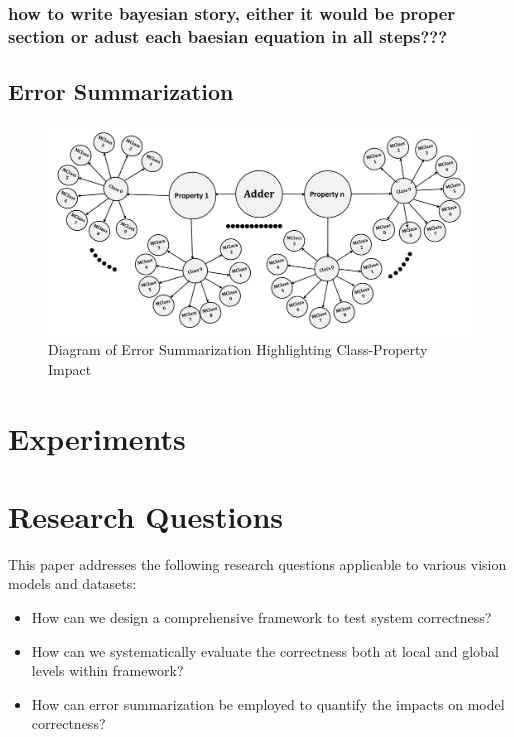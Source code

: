 \documentclass[10pt, conference, a4paper, final]{IEEEtran}
\begin{document}
 
\subsubsection{how to write bayesian story, either it would be proper section or adust each baesian equation in all steps??? }
\subsection{Error Summarization}

\begin{figure}[H]
    \centering
    \includegraphics[width=\linewidth]{paper_images/step5.pdf}
    \caption{Diagram of Error Summarization Highlighting Class-Property Impact}
    \label{fig:error-summarization}
\end{figure}





\section{Experiments}

\section{Research Questions}

This paper addresses the following research questions applicable to various vision models and datasets:

\begin{itemize}
    \item How can we design a comprehensive framework to test system correctness?
    \item How can we systematically evaluate the correctness both at local and global levels within framework?
    \item How can error summarization be employed to quantify the impacts on model correctness?
 
\end{itemize}
\end{document}
